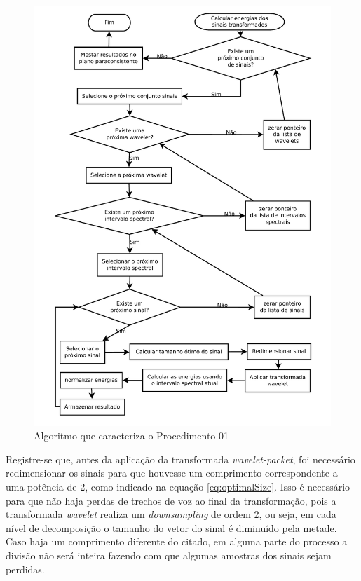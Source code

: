 		\begin{figure}[H]
			\centering
			\includegraphics[width=1\linewidth]{images/AlgoProcedure01.pdf}
			\caption{Algoritmo que caracteriza o Procedimento 01}
			\label{fig:experiment01Algo}
		\end{figure}
		
		\par Registre-se que, antes da aplicação da transformada \textit{wavelet-packet}, foi necessário redimensionar os sinais para que houvesse um comprimento correspondente a uma potência de 2, como indicado na equação \ref{eq:optimalSize}. Isso é necessário para que não haja perdas de trechos de voz ao final da transformação, pois a transformada \textit{wavelet} realiza um \textit{downsampling} de ordem 2, ou seja, em cada nível de decomposição o tamanho do vetor do sinal é diminuído pela metade. Caso haja um comprimento diferente do citado, em alguma parte do processo a divisão não será inteira fazendo com que algumas amostras dos sinais sejam perdidas.
				
